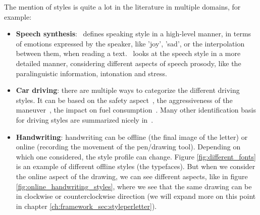   \par The mention of styles is quite a lot in the literature in multiple domains, for example:
  \begin{itemize}
    \item \textbf{Speech synthesis}:~\citep{tachibana2004hmm} defines speaking style in a high-level manner, in terms of emotions expressed by the speaker, like 'joy', 'sad', or the interpolation between them, when reading a text.~\citep{wang2018style} looks at the speech style in a more detailed manner, considering different aspects of speech prosody, like the paralinguistic information, intonation and stress.
    \item \textbf{Car driving}: there are multiple ways to categorize the different driving styles. It can be based on the safety aspect~\citep{johnson2011driving}, the aggressiveness of the maneuver~\citep{dorr2014online,xu2015establishing}, the impact on fuel consumption~\citep{manzoni2010driving,neubauer2013accounting}. Many other identification basis for driving styles are summarized nicely in~\citep{martinez2017driving}.
    \item \textbf{Handwriting}: handwriting can be offline (the final image of the letter) or online (recording the movement of the pen/drawing tool). Depending on which one considered, the style profile can change. Figure \ref{fig:different_fonts} is an example of different offline styles (the typefaces). But when we consider the online aspect of the drawing, we can see different aspects, like in figure \ref{fig:online_handwriting_styles}, where we see that the same drawing can be in clockwise or counterclockwise direction (we will expand more on this point in chapter \ref{ch:framework_sec:styleperletter}).
  \end{itemize}

